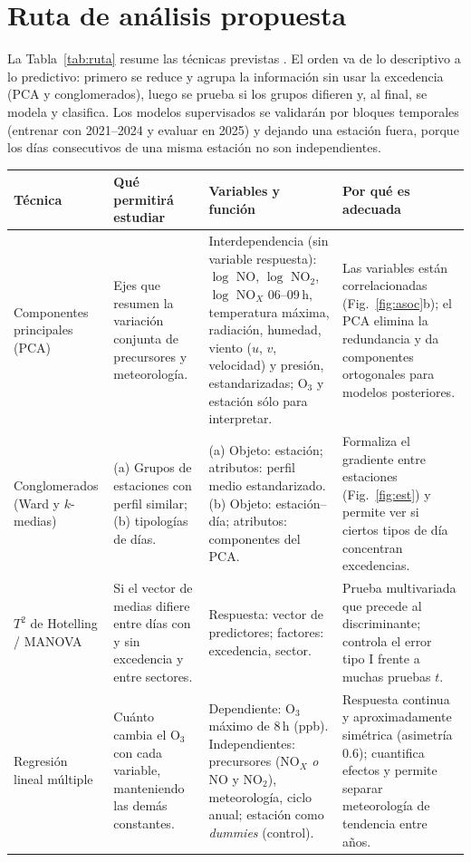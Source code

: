 \documentclass[11pt,letterpaper]{article}
\newcommand{\Othree}{O$_3$}
\newcommand{\NOx}{NO$_X$}
\begin{document}
\section{Ruta de an\'alisis propuesta}
La Tabla~\ref{tab:ruta} resume las t\'ecnicas previstas \cite{johnson2007}. El orden va de lo descriptivo a lo predictivo: primero se reduce y agrupa la informaci\'on sin usar la excedencia (PCA y conglomerados), luego se prueba si los grupos difieren y, al final, se modela y clasifica. Los modelos supervisados se validar\'an por bloques temporales (entrenar con 2021--2024 y evaluar en 2025) y dejando una estaci\'on fuera, porque los d\'ias consecutivos de una misma estaci\'on no son independientes.

\begin{table}[h]
\centering
\footnotesize
\renewcommand{\arraystretch}{1.05}
\begin{tabular}{@{}P{2.1cm}P{3.6cm}P{5.3cm}P{4.6cm}@{}}
\toprule
T\'ecnica & Qu\'e permitir\'a estudiar & Variables y funci\'on & Por qu\'e es adecuada \\
\midrule
Componentes principales (PCA) & Ejes que resumen la variaci\'on conjunta de precursores y meteorolog\'ia. & Interdependencia (sin variable respuesta): $\log$ NO, $\log$ NO$_2$, $\log$ \NOx{} 06--09\,h, temperatura m\'axima, radiaci\'on, humedad, viento ($u$, $v$, velocidad) y presi\'on, estandarizadas; \Othree{} y estaci\'on s\'olo para interpretar. & Las variables est\'an correlacionadas (Fig.~\ref{fig:asoc}b); el PCA elimina la redundancia y da componentes ortogonales para modelos posteriores. \\
Conglomerados (Ward y $k$-medias) & (a) Grupos de estaciones con perfil similar; (b) tipolog\'ias de d\'ias. & (a) Objeto: estaci\'on; atributos: perfil medio estandarizado. (b) Objeto: estaci\'on--d\'ia; atributos: componentes del PCA. & Formaliza el gradiente entre estaciones (Fig.~\ref{fig:est}) y permite ver si ciertos tipos de d\'ia concentran excedencias. \\
$T^2$ de Hotelling / MANOVA & Si el vector de medias difiere entre d\'ias con y sin excedencia y entre sectores. & Respuesta: vector de predictores; factores: excedencia, sector. & Prueba multivariada que precede al discriminante; controla el error tipo I frente a muchas pruebas $t$. \\
Regresi\'on lineal m\'ultiple & Cu\'anto cambia el \Othree{} con cada variable, manteniendo las dem\'as constantes. & Dependiente: \Othree{} m\'aximo de 8\,h (ppb). Independientes: precursores (\NOx{} \emph{o} NO y NO$_2$), meteorolog\'ia, ciclo anual; estaci\'on como \emph{dummies} (control). & Respuesta continua y aproximadamente sim\'etrica (asimetr\'ia 0.6); cuantifica efectos y permite separar meteorolog\'ia de tendencia entre a\~nos. \\

\end{tabular}
\end{table}
\end{document}
